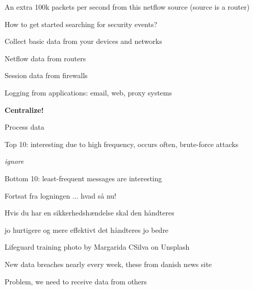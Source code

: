\documentclass[Screen16to9,17pt]{foils}
\begin{document}


\centerline{An extra 100k packets per second from this netflow source (source is a router)}



\begin{list1}
\item How to get started searching for security events?
\item Collect basic data from your devices and networks
\begin{list2}
\item Netflow data from routers
\item Session data from firewalls
\item Logging from applications: email, web, proxy systems
\end{list2}
\item {\bf Centralize!}
\item Process data
\begin{list2}
\item Top 10: interesting due to high frequency, occurs often, brute-force attacks
\item {\it ignore}
\item Bottom 10: least-frequent messages are interesting
\end{list2}
\end{list1}



\begin{list2}
\item Fortsat fra logningen ... hvad så nu!
\item Hvis du har en sikkerhedshændelse skal den håndteres
\item jo hurtigere og mere effektivt det håndteres jo bedre
\end{list2}

Lifeguard training photo by Margarida CSilva on Unsplash



New data breaches nearly every week, these from danish news site 

Problem, we need to receive data from others
\end{document}
